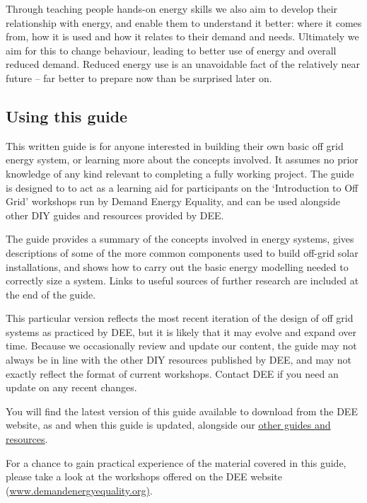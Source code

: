 \documentclass{article}
\theoremstyle{definition}
\theoremstyle{definition}
\theoremstyle{remark}
\begin{document}
    Through teaching people hands-on energy skills we also aim to develop their relationship with energy, and enable them to understand it better: where it comes from, how it is used and how it relates to their demand and needs. Ultimately we aim for this to change behaviour, leading to better use of energy and overall reduced demand. Reduced energy use is an unavoidable fact of the relatively near future – far better to prepare now than be surprised later on.

  
  {\color{blue}\subsection{Using this guide}} %
  \label{sub:using_this_guide}

    This written guide is for anyone interested in building their own basic off grid energy system, or learning more about the concepts involved. It assumes no prior knowledge of any kind relevant to completing a fully working project. The guide is designed to to act as a learning aid for participants on the ‘Introduction to Off Grid’ workshops run by Demand Energy Equality, and can be used alongside other DIY guides and resources provided by DEE. 

    The guide provides a summary of the concepts involved in energy systems, gives descriptions of some of the more common components used to build off-grid solar installations, and shows how to carry out the basic energy modelling needed to correctly size a system. Links to useful sources of further research are included at the end of the guide.

    This particular version reflects the most recent iteration of the design of off grid systems as practiced by DEE, but it is likely that it may evolve and expand over time.  Because we occasionally review and update our content, the guide may not always be in line with the other DIY resources published by DEE, and may not exactly reflect the format of current workshops. Contact DEE if you need an update on any recent changes. 

    You will find the latest version of this guide available to download from the DEE website, as and when this guide is updated, alongside our \href{https://www.demandenergyequality.org/resources/}{\underline{other guides and resources}}.

    For a chance to gain practical experience of the material covered in this guide, please take a look at the workshops offered on the DEE website (\href{www.demandenergyequality.org}{\underline{www.demandenergyequality.org)}}.
\end{document}

